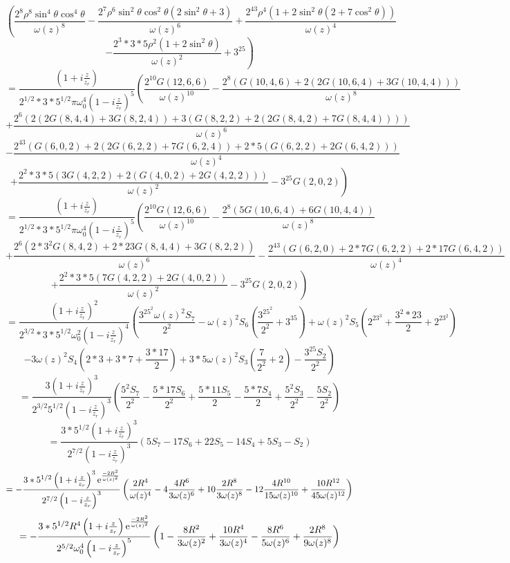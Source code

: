 \documentclass[11pt]{amsart}
\makeatletter
\newcommand{\e}{{\rm e}}				%
\newcommand{\0}{\varnothing}		%
\newcommand{\1}{!}
\newcommand{\2}{@}
\newcommand{\3}{\#}
\newcommand{\4}{\$}
\newcommand{\5}{\%}
\newcommand{\6}{$^\wedge$}
\newcommand{\7}{\&}
\newcommand{\8}{*}
\newcommand{\9}{(}
\makeatother
\begin{document}
\[
\left(\frac{2^8\rho^8\sin^4\theta\cos^4\theta}{\omega(z)^8}-\frac{2^7\rho^6\sin^2\theta\cos^2\theta\left(2\sin^2\theta+3\right)}{\omega(z)^6}+\frac{2^43\rho^4\left(1+2\sin^2\theta\left(2+7\cos^2\theta\right)\right)}{\omega(z)^4}\right.
\]
\[
\left.-\frac{2^3*3*5\rho^2\left(1+2\sin^2\theta\right)}{\omega(z)^2}+3^25\right)
\]
\[
=\frac{\left(1+i\frac{z}{z_r}\right)}{2^{1/2}*3*5^{1/2}\pi\omega_0^4\left(1-i\frac{z}{z_r}\right)^5}\left(\frac{2^{10}G(12,6,6)}{\omega(z)^{10}}-\frac{2^8\left(G(10,4,6)+2\left(2G(10,6,4)+3G(10,4,4)\right)\right)}{\omega(z)^8}\right.
\]
\[
\left.+\frac{2^6\left(2\left(2G(8,4,4)+3G(8,2,4)\right)+3\left(G(8,2,2)+2\left(2G(8,4,2)+7G(8,4,4)\right)\right)\right)}{\omega(z)^6}\right.
\]
\[
\left.-\frac{2^43\left(G(6,0,2)+2\left(2G(6,2,2)+7G(6,2,4)\right)+2*5\left(G(6,2,2)+2G(6,4,2)\right)\right)}{\omega(z)^4}\right.
\]
\[
\left.+\frac{2^2*3*5\left(3G(4,2,2)+2\left(G(4,0,2)+2G(4,2,2)\right)\right)}{\omega(z)^2}-3^25G(2,0,2)\right)
\]
\[
=\frac{\left(1+i\frac{z}{z_r}\right)}{2^{1/2}*3*5^{1/2}\pi\omega_0^4\left(1-i\frac{z}{z_r}\right)^5}\left(\frac{2^{10}G(12,6,6)}{\omega(z)^{10}}-\frac{2^8\left(5G(10,6,4)+6G(10,4,4)\right)}{\omega(z)^8}\right.
\]
\[
\left.+\frac{2^6\left(2*3^2G(8,4,2)+2*23G(8,4,4)+3G(8,2,2)\right)}{\omega(z)^6}-\frac{2^43\left(G(6,2,0)+2*7G(6,2,2)+2*17G(6,4,2)\right)}{\omega(z)^4}\right.
\]
\[
\left.+\frac{2^2*3*5\left(7G(4,2,2)+2G(4,0,2)\right)}{\omega(z)^2}-3^25G(2,0,2)\right)
\]
\[
=\frac{\left(1+i\frac{z}{z_r}\right)^2}{2^{3/2}*3*5^{1/2}\omega_0^2\left(1-i\frac{z}{z_r}\right)^4}\left(\frac{3^25^2\omega(z)^2S_7}{2^2}-\omega(z)^2S_6\left(\frac{3^25^2}{2^2}+3^35\right)+\omega(z)^2S_5\left(2^23^3+\frac{3^2*23}{2}+2^23^2\right)\right.
\]
\[
\left.-3\omega(z)^2S_4\left(2*3+3*7+\frac{3*17}{2}\right)+3*5\omega(z)^2S_3\left(\frac{7}{2^2}+2\right)-\frac{3^25S_2}{2^2}\right)
\]
\[
=\frac{3\left(1+i\frac{z}{z_r}\right)^3}{2^{3/2}5^{1/2}\left(1-i\frac{z}{z_r}\right)^3}\left(\frac{5^2S_7}{2^2}-\frac{5*17S_6}{2^2}+\frac{5*11S_5}{2}-\frac{5*7S_4}{2}+\frac{5^2S_3}{2^2}-\frac{5S_2}{2^2}\right)
\]
\[
=\frac{3*5^{1/2}\left(1+i\frac{z}{z_r}\right)^3}{2^{7/2}\left(1-i\frac{z}{z_r}\right)^3}\left(5S_7-17S_6+22S_5-14S_4+5S_3-S_2\right)
\]
\[
=-\frac{3*5^{1/2}\left(1+i\frac{z}{z_r}\right)^3\e^{\frac{-2R^2}{\omega(z)^2}}}{2^{7/2}\left(1-i\frac{z}{z_r}\right)^3}\left(\frac{2R^4}{\omega(z)^4}-4\frac{4R^6}{3\omega(z)^6}+10\frac{2R^8}{3\omega(z)^8}-12\frac{4R^{10}}{15\omega(z)^{10}}+\frac{10R^{12}}{45\omega(z)^{12}}\right)
\]
\[
=-\frac{3*5^{1/2}R^4\left(1+i\frac{z}{z_r}\right)\e^{\frac{-2R^2}{\omega(z)^2}}}{2^{5/2}\omega_0^4\left(1-i\frac{z}{z_r}\right)^5}\left(1-\frac{8R^2}{3\omega(z)^2}+\frac{10R^4}{3\omega(z)^4}-\frac{8R^6}{5\omega(z)^6}+\frac{2R^8}{9\omega(z)^8}\right)
\]
\end{document}
